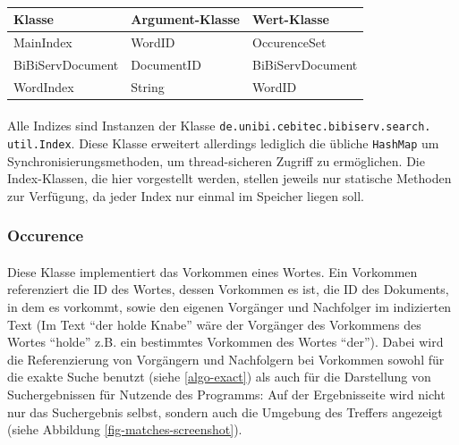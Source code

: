 \paragraph{}

\begin{tabularx}{\textwidth}{llX}
\hline
\textbf{Klasse} & \textbf{Argument-Klasse} & \textbf{Wert-Klasse} \\ [0.1cm]
\hline
MainIndex & WordID & OccurenceSet \\ [0.1cm]
\hline
BiBiServDocument & DocumentID & BiBiServDocument \\ [0.1cm]
\hline
WordIndex & String & WordID \\ [0.1cm]
\hline
\end{tabularx}

\paragraph{} Alle Indizes sind Instanzen der Klasse \texttt{de.unibi.cebitec.bibiserv.search.\\util.Index}. Diese Klasse erweitert allerdings lediglich die übliche \texttt{HashMap} um Synchronisierungsmethoden, um thread-sicheren Zugriff zu ermöglichen. Die Index-Klassen, die hier vorgestellt werden, stellen jeweils nur statische Methoden zur Verfügung, da jeder Index nur einmal im Speicher liegen soll.

\subsubsection{Occurence}

\paragraph{} Diese Klasse implementiert das Vorkommen eines Wortes. Ein Vorkommen referenziert die ID des Wortes, dessen Vorkommen es ist, die ID des Dokuments, in dem es vorkommt, sowie den eigenen Vorgänger und Nachfolger im indizierten Text (Im Text "`der holde Knabe"' wäre der Vorgänger des Vorkommens des Wortes "`holde"' z.B. ein bestimmtes Vorkommen des Wortes "`der"'). Dabei wird die Referenzierung von Vorgängern und Nachfolgern bei Vorkommen sowohl für die exakte Suche benutzt (siehe \ref{algo-exact}) als auch für die Darstellung von Suchergebnissen für Nutzende des Programms: Auf der Ergebnisseite wird nicht nur das Suchergebnis selbst, sondern auch die Umgebung des Treffers angezeigt (siehe Abbildung \ref{fig-matches-screenshot}).

